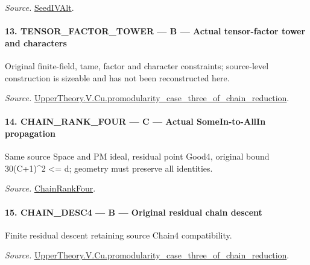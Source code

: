 \documentclass[11pt,a4paper]{article}
\numberwithin{equation}{section}
\theoremstyle{remark}\newtheorem{remark}[theorem]{Remark}
\begin{document}
\emph{Source.} \href{https://github.com/CocoSgt/riemann-hypothesis-lean/blob/7cbf7a0c32fca1badf05931879a37c3f8a2b03b4/src/Development/AutomorphicArithmetic/AutomorphicVarieties/ModularityArgument/ThresholdArguments/DenseThresholdCases/PromodularityCaseThree.lean#L19-L25}{SeedIVAlt}.



\paragraph{13. TENSOR\_\allowbreak FACTOR\_\allowbreak TOWER — B — Actual tensor-factor tower and characters}

Original finite-field, tame, factor and character constraints; source-level construction is sizeable and has not been reconstructed here.

\emph{Source.} \href{https://github.com/CocoSgt/riemann-hypothesis-lean/blob/7cbf7a0c32fca1badf05931879a37c3f8a2b03b4/src/Development/AutomorphicArithmetic/AutomorphicVarieties/ModularityArgument/ThresholdArguments/DenseThresholdCases/PromodularityCaseThreeOfLemmas.lean#L131-L153}{UpperTheory.V.Cu.promodularity\_\allowbreak case\_\allowbreak three\_\allowbreak of\_\allowbreak chain\_\allowbreak reduction}.



\paragraph{14. CHAIN\_\allowbreak RANK\_\allowbreak FOUR — C — Actual SomeIn-to-AllIn propagation}

Same source Space and PM ideal, residual point Good4, original bound 30(C+1)\textasciicircum{}2 <= d; geometry must preserve all identities.

\emph{Source.} \href{https://github.com/CocoSgt/riemann-hypothesis-lean/blob/7cbf7a0c32fca1badf05931879a37c3f8a2b03b4/src/Development/AutomorphicArithmetic/AutomorphicVarieties/ModularityArgument/ThresholdArguments/DenseThresholdCases/PromodularityCaseThree.lean#L26-L32}{ChainRankFour}.



\paragraph{15. CHAIN\_\allowbreak DESC4 — B — Original residual chain descent}

Finite residual descent retaining source Chain4 compatibility.

\emph{Source.} \href{https://github.com/CocoSgt/riemann-hypothesis-lean/blob/7cbf7a0c32fca1badf05931879a37c3f8a2b03b4/src/Development/AutomorphicArithmetic/AutomorphicVarieties/ModularityArgument/ThresholdArguments/DenseThresholdCases/PromodularityCaseThreeOfLemmas.lean#L131-L153}{UpperTheory.V.Cu.promodularity\_\allowbreak case\_\allowbreak three\_\allowbreak of\_\allowbreak chain\_\allowbreak reduction}.
\end{document}
